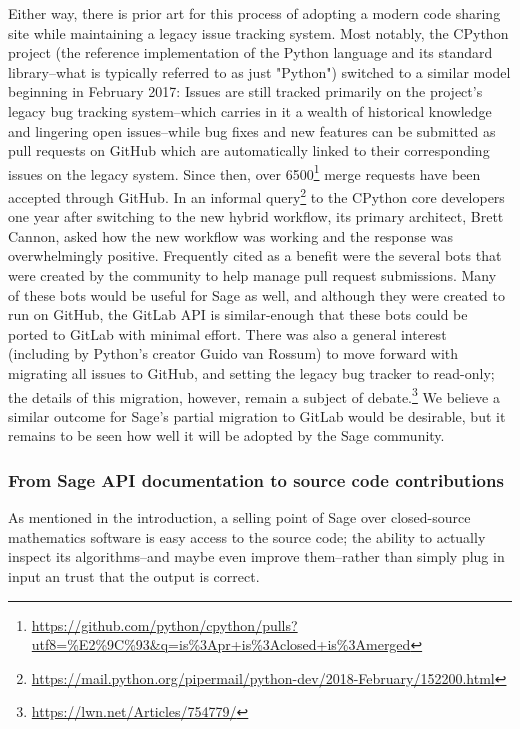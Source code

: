 {Either way, there is prior art for this process of adopting a modern code
sharing site while maintaining a legacy issue tracking system.  Most notably,
the CPython project (the reference implementation of the Python language and
its standard library--what is typically referred to as just "Python") switched
to a similar model beginning in February 2017: Issues are still tracked
primarily on the project's legacy bug tracking system--which carries in it a
wealth of historical knowledge and lingering open issues--while bug fixes and
new features can be submitted as pull requests on GitHub which are
automatically linked to their corresponding issues on the legacy system.  Since
then, over
6500\footnote{\url{https://github.com/python/cpython/pulls?utf8=\%E2\%9C\%93\&q=is\%3Apr+is\%3Aclosed+is\%3Amerged}}
merge requests have been accepted through GitHub.  In an informal
query\footnote{\url{https://mail.python.org/pipermail/python-dev/2018-February/152200.html}}
to the CPython core developers one year after switching to the new hybrid
workflow, its primary architect, Brett Cannon, asked how the new workflow was
working and the response was overwhelmingly positive.  Frequently cited as a
benefit were the several bots that were created by the community to help manage
pull request submissions.  Many of these bots would be useful for Sage as well,
and although they were created to run on GitHub, the GitLab API is
similar-enough that these bots could be ported to GitLab with minimal effort.
There was also a general interest (including by Python's creator Guido van
Rossum) to move forward with migrating all issues to GitHub, and setting the
legacy bug tracker to read-only; the details of this migration, however, remain
a subject of debate.\footnote{\url{https://lwn.net/Articles/754779/}}  We
believe a similar outcome for Sage's partial migration to GitLab would be
desirable, but it remains to be seen how well it will be adopted by the Sage
community.


\hypertarget{source-in-documentation}{%
\subsubsection{From Sage API documentation to source code contributions}\label{source-in-documentation}}

As mentioned in the introduction, a selling point of Sage over closed-source
mathematics software is easy access to the source code; the ability to actually
inspect its algorithms--and maybe even improve them--rather than simply plug in
input an trust that the output is correct.

}
